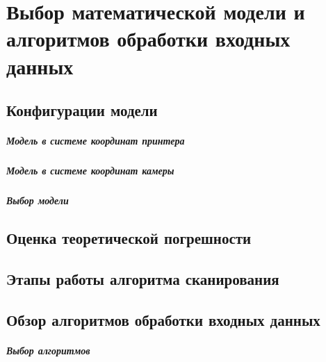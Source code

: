 \chapter{Выбор математической модели и алгоритмов обработки входных данных}
    \section{Конфигурации модели}
        \paragraph{Модель в системе координат принтера}
        \paragraph{Модель в системе координат камеры}
        \paragraph{Выбор модели}

    \section{Оценка теоретической погрешности}
    
    \section{Этапы работы алгоритма сканирования}
    
    \section{Обзор алгоритмов обработки входных данных}
        \paragraph{Выбор алгоритмов}